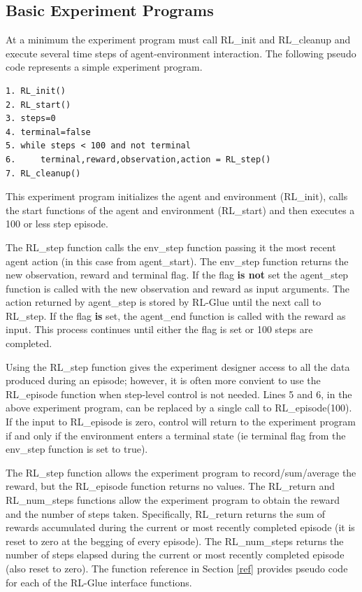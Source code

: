 \documentclass[11pt]{article}
\begin{document}
\subsection{Basic Experiment Programs}
\label{expp1}

At a minimum the experiment program must call RL\_init and RL\_cleanup and execute several time steps of agent-environment interaction. The following pseudo code represents a simple experiment program.
\begin{verbatim}
1. RL_init()
2. RL_start()
3. steps=0
4. terminal=false 
5. while steps < 100 and not terminal
6.     terminal,reward,observation,action = RL_step()
7. RL_cleanup()
\end{verbatim}
This experiment program initializes the agent and environment (RL\_init), calls the start functions of the agent and environment (RL\_start) and then executes a 100 or less step episode. 

The RL\_step function calls the env\_step function passing it the most recent agent action (in this case from agent\_start). The env\_step function returns the new observation, reward and terminal flag. If the flag {\bf is not} set the agent\_step function is called with the new observation and reward as input arguments. The action returned by agent\_step is stored by RL-Glue until the next call to RL\_step. If the flag {\bf is} set, the agent\_end function is called with the reward as input. This process continues until either the flag is set or 100 steps are completed. 

Using the RL\_step function gives the experiment designer access to all the data produced during an episode; however, it is often more convient to use the RL\_episode function when step-level control is not needed. Lines 5 and 6, in the above experiment program, can be replaced by a single call to RL\_episode(100). If the input to RL\_episode is zero, control will return to the experiment program if and only if the environment enters a terminal state (ie terminal flag from the env\_step function is set to true).

The RL\_step function allows the experiment program to record/sum/average the reward, but the RL\_episode function returns no values. The RL\_return and RL\_num\_steps functions allow the experiment program to obtain the reward and the number of steps taken. Specifically, RL\_return returns the sum of rewards accumulated during the current or most recently completed episode (it is reset to zero at the begging of every episode). The RL\_num\_steps returns the number of steps elapsed during the current or most recently completed episode (also reset to zero). The function reference in Section \ref{ref} provides pseudo code for each of the RL-Glue interface functions.
\end{document}
